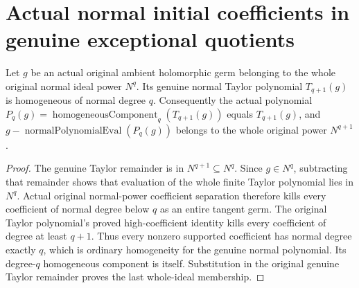\section{Actual normal initial coefficients in genuine exceptional quotients}

\begin{theorem}
\label{hir:actual-normal-power-canonical-homogeneous-polynomial}
Let $g$ be an actual original ambient holomorphic germ belonging to the
whole original normal ideal power $N^q$. Its genuine normal Taylor
polynomial $T_{q+1}(g)$ is homogeneous of normal degree $q$.
Consequently the actual polynomial
$P_q(g)=\operatorname{homogeneousComponent}_q(T_{q+1}(g))$ equals
$T_{q+1}(g)$, and $g-\operatorname{normalPolynomialEval}(P_q(g))$
belongs to the whole original power $N^{q+1}$.
\leanok
\end{theorem}
\begin{proof}
The genuine Taylor remainder is in $N^{q+1}\subseteq N^q$.
Since $g\in N^q$, subtracting that remainder shows that evaluation
of the whole finite Taylor polynomial lies in $N^q$. Actual original
normal-power coefficient separation therefore kills every coefficient
of normal degree below $q$ as an entire tangent germ. The original
Taylor polynomial's proved high-coefficient identity kills every
coefficient of degree at least $q+1$. Thus every nonzero supported
coefficient has normal degree exactly $q$, which is ordinary
homogeneity for the genuine normal polynomial. Its degree-$q$
homogeneous component is itself. Substitution in the original genuine
Taylor remainder proves the last whole-ideal membership.
\end{proof}

